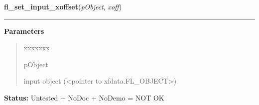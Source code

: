     \label{xformslib:library:fl_set_input_xoffset}

    \vspace{0.5ex}

\hspace{.8\funcindent}\begin{boxedminipage}{\funcwidth}

    \raggedright \textbf{fl\_set\_input\_xoffset}(\textit{pObject}, \textit{xoff})

    \vspace{-1.5ex}

    \rule{\textwidth}{0.5\fboxrule}
\setlength{\parskip}{2ex}
\setlength{\parskip}{1ex}
      \textbf{Parameters}
      \vspace{-1ex}

      \begin{quote}
        \begin{Ventry}{xxxxxxx}

          \item[pObject]

          input object ({\textless}pointer to 
          xfdata.FL\_OBJECT{\textgreater})

        \end{Ventry}

      \end{quote}

\textbf{Status:} Untested + NoDoc + NoDemo = NOT OK



    \end{boxedminipage}

    \label{xformslib:library:fl_get_input_xoffset}

    \vspace{0.5ex}

